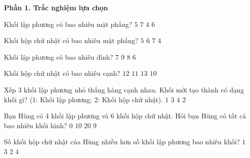 \textbf{Phần 1. Trắc nghiệm lựa chọn}

\begin{ex} %
Khối lập phương có bao nhiêu mặt phẳng?
\choice
{$5$}
{$7$}
{$4$}
{\True $6$}
\end{ex}

\begin{ex} %
Khối hộp chữ nhật có bao nhiêu mặt phẳng?
\choice
{$5$}
{\True $6$}
{$7$}
{$4$}
\end{ex}

\begin{ex} %
Khối lập phương có bao nhiêu đỉnh?
\choice
{$7$}
{$9$}
{\True $8$}
{$6$}
\end{ex}

\begin{ex} %
Khối hộp chữ nhật có bao nhiêu cạnh?
\choice
{\True $12$}
{$11$}
{$13$}
{$10$}
\end{ex}

\begin{ex} %
Xếp 3 khối lập phương nhỏ thẳng hàng cạnh nhau. Khối mới tạo thành có dạng khối gì? (1: Khối lập phương; 2: Khối hộp chữ nhật).
\choice
{$1$}
{$3$}
{$4$}
{\True $2$}
\end{ex}

\begin{ex} %
Bạn Hùng có 4 khối lập phương và 6 khối hộp chữ nhật. Hỏi bạn Hùng có tất cả bao nhiêu khối hình?
\choice
{$0$}
{\True $10$}
{$20$}
{$9$}
\end{ex}

\begin{ex} %
Số khối hộp chữ nhật của Hùng nhiều hơn số khối lập phương bao nhiêu khối?
\choice
{$1$}
{$3$}
{\True $2$}
{$4$}
\end{ex}

